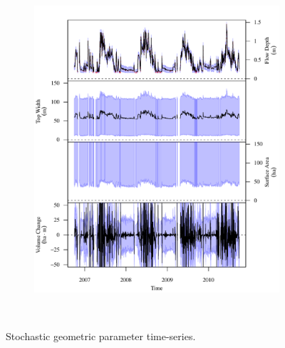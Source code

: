 \begin{linenumbers}
\begin{landscape}
\begin{figure}
\begin{subfigure}{0.7\textwidth}
			\includegraphics[width=\textwidth]{"Figures/Results_USR/Stochastic/G TS D"}
			\label{sub:GeoTS_D}
		\end{subfigure}\\
		\caption{Stochastic geometric parameter time-series.}
	\end{figure}
\end{landscape}


\end{linenumbers}
